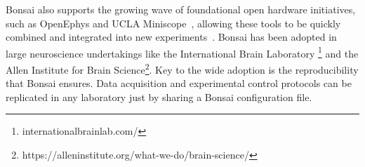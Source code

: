 Bonsai also supports the growing wave of foundational
open hardware initiatives, such as OpenEphys \citep{siegleEtAl17} and UCLA
Miniscope~\citep{caiEtAl16}, allowing these tools to be quickly combined and integrated into new experiments~\citep{buccinoEtAl18}.
%
Bonsai has been adopted in large neuroscience undertakings like the
International Brain
Laboratory \footnote{internationalbrainlab.com/}
and the Allen Institute for Brain
Science\footnote{https://alleninstitute.org/what-we-do/brain-science/}.
%
Key to the wide adoption is the reproducibility that Bonsai ensures.  Data acquisition and experimental control protocols can be 
replicated in any laboratory just by sharing a Bonsai configuration file. 
%


